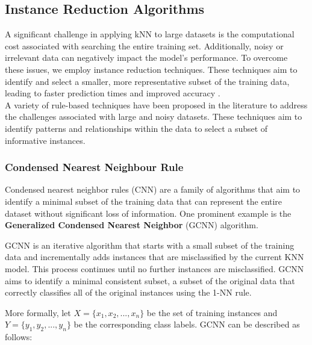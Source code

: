 
\subsection{Instance Reduction Algorithms}
\label{subsec:methods-reduction}

A significant challenge in applying kNN to large datasets is the computational cost 
associated with searching the entire training set. Additionally, noisy or irrelevant 
data can negatively impact the model's performance. 
To overcome these issues, we employ instance reduction techniques. 
These techniques aim to identify and select a smaller, more representative subset of
the training data, leading to faster prediction times and improved accuracy \cite{Wilson2000}.\\

A variety of rule-based techniques have been proposed in the literature to 
address the challenges associated with large and noisy datasets. 
These techniques aim to identify patterns and relationships within the data to select 
a subset of informative instances.

\subsubsection{Condensed Nearest Neighbour Rule}
Condensed nearest neighbor rules (CNN) are a family of algorithms that aim to identify 
a minimal subset of the training data that can represent the entire dataset without 
significant loss of information. One prominent example is the \textbf{Generalized Condensed 
Nearest Neighbor} (GCNN) algorithm.

GCNN \cite{hart1968condensed} is an iterative algorithm that starts with a small subset of 
the training data and incrementally adds instances that are misclassified by the current KNN model. 
This process continues until no further instances are misclassified. GCNN aims to identify a minimal 
consistent subset, a subset of the original data that correctly classifies all of the original 
instances using the 1-NN rule.

More formally, let $X = \{x_1, x_2, ..., x_n\}$ be the set of training instances and $Y = \{y_1, y_2, ..., y_n\}$ be 
the corresponding class labels. GCNN can be described as follows:

